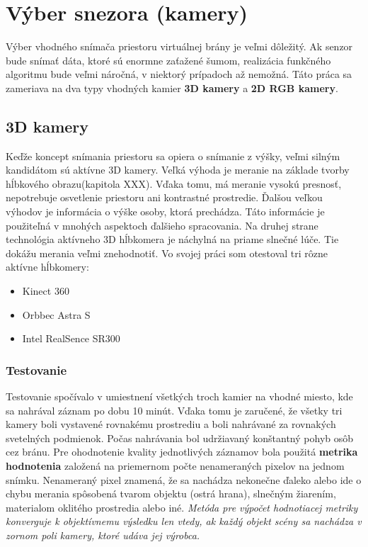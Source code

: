 \section{Výber snezora (kamery)}
Výber vhodného snímača priestoru virtuálnej brány je veľmi dôležitý. Ak senzor bude snímať dáta, ktoré sú enormne zaťažené šumom, realizácia funkčného algoritmu bude veľmi náročná, v niektorý prípadoch až nemožná. Táto práca sa zameriava na dva typy vhodných kamier \textbf{3D kamery} a\textbf{ 2D  RGB kamery}.

\subsection{3D kamery}
Keďže  koncept snímania priestoru sa opiera o snímanie z výšky, veľmi silným kandidátom sú aktívne 3D kamery. Veľká výhoda je meranie na základe tvorby hĺbkového obrazu(kapitola XXX). Vďaka tomu, má meranie vysokú presnosť, nepotrebuje osvetlenie priestoru ani kontrastné prostredie.  Ďalšou veľkou výhodov je informácia o výške osoby, ktorá prechádza. Táto informácie je použiteľná v mnohých aspektoch ďalšieho spracovania. Na druhej strane technológia aktívneho 3D hĺbkomera je náchylná na priame slnečné lúče. Tie dokážu merania veľmi znehodnotiť. Vo svojej práci som otestoval tri rôzne aktívne hĺbkomery: 

\begin{itemize}
\item Kinect 360
\item Orbbec Astra S
\item Intel RealSence SR300

\end{itemize}

\subsubsection{Testovanie}
Testovanie spočívalo v umiestnení všetkých troch kamier na vhodné miesto, kde sa nahrával záznam po dobu 10 minút. Vďaka tomu je zaručené, že všetky tri kamery boli vystavené rovnakému prostrediu a boli nahrávané za rovnakých svetelných podmienok.  Počas nahrávania bol udržiavaný konštantný pohyb osôb cez bránu. Pre ohodnotenie kvality jednotlivých záznamov bola použitá \textbf{metrika hodnotenia} založená na priemernom počte nenameraných pixelov na jednom snímku. Nenameraný pixel znamená, že sa nachádza nekonečne ďaleko alebo ide o chybu merania spôsobená tvarom objektu (ostrá hrana), slnečným žiarením, materialom oklitého prostredia alebo iné. \textit{Metóda pre výpočet hodnotiacej metriky konverguje k objektívnemu výsledku len vtedy, ak každý objekt scény sa nachádza v zornom poli kamery, ktoré udáva jej výrobca.}  

